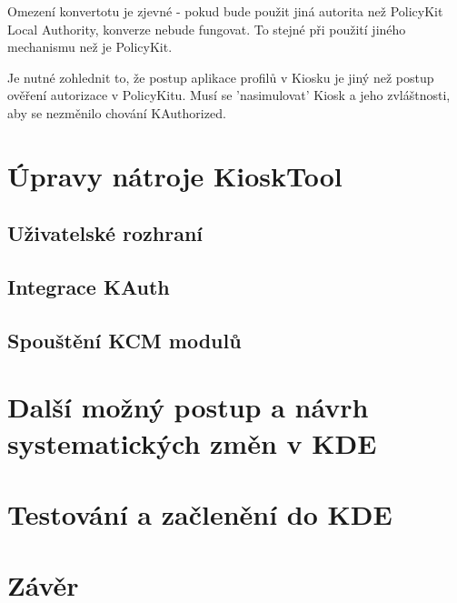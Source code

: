 Omezení konvertotu je zjevné - pokud bude použit jiná autorita než PolicyKit
Local Authority, konverze nebude fungovat. To stejné při použití jiného
mechanismu než je PolicyKit.

Je nutné zohlednit to, že postup aplikace profilů v Kiosku je jiný než postup
ověření autorizace v PolicyKitu. Musí se 'nasimulovat' Kiosk a jeho zvláštnosti,
aby se nezměnilo chování KAuthorized.


\chapter{Úpravy nátroje KioskTool}
\section{Uživatelské rozhraní}
\section{Integrace KAuth}
\section{Spouštění KCM modulů}
\chapter{Další možný postup a návrh systematických změn v KDE}
\chapter{Testování a začlenění do KDE}
\chapter{Závěr}
\cite{fitWeb}
